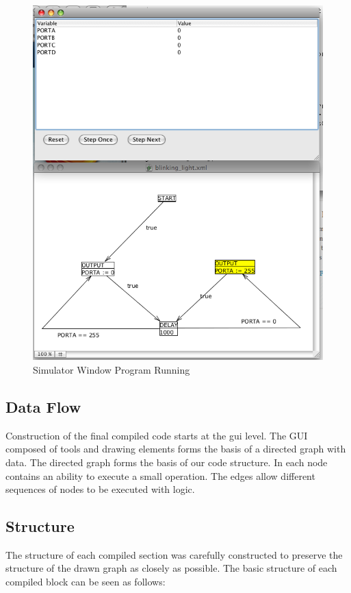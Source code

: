 \begin{figure}[htp]
    \centering
    \includegraphics[width=\imgmedium]{./images/plcedit_simulator_running.png}
    \caption{Simulator Window Program Running}
    \label{fig:plcedit_simulator_running}
\end{figure}





\subsection{Data Flow}
Construction of the final compiled code starts at the gui level. The GUI composed of tools and drawing elements forms the basis of a directed graph with data. The directed graph forms the basis of our code structure. In each node contains an ability to execute a small operation. The edges allow different sequences of nodes to be executed with logic.

\subsection{Structure}
The structure of each compiled section was carefully constructed to preserve the structure of the drawn graph as closely as possible. The basic structure of each compiled block can be seen as follows:

